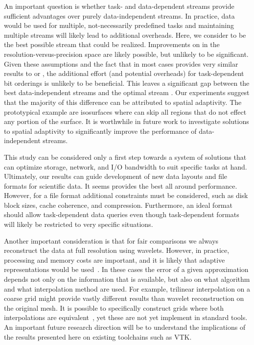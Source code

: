 {\color{red}An important question is whether task- and data-dependent streams provide sufficient
advantages over purely data-independent streams. In practice, data would be used for multiple,
not-necessarily predefined tasks and maintaining multiple streams will likely lead to additional
overheads. Here, we consider \ssig to be the best possible stream that could be realized.
Improvements on \ssig in the resolution-versus-precision space are likely possible, but unlikely to
be significant. Given these assumptions and the fact that \ssig in most cases provides very similar
results to \sbit or \swav, the additional effort (and potential overheads) for task-dependent bit
orderings is unlikely to be beneficial. This leaves a significant gap between the best
data-independent streams and the optimal stream \sopt. Our experiments suggest that the majority of
this difference can be attributed to spatial adaptivity. The prototypical example are isosurfaces
where \sopt can skip all regions that do not effect any portion of the surface. It is worthwhile in
future work to investigate solutions to spatial adaptivity to significantly improve the performance
of data-independent streams.}

This study can be considered only a first step towards a system of solutions that can optimize
storage, network, and I/O bandwidth to suit specific tasks at hand. Ultimately, our results can
guide development of new data layouts and file formats for scientific data. It seems \swav provides
the best all around performance. However, for a file format additional constraints must be
considered, such as disk block sizes, cache coherence, and compression. Furthermore, an ideal format
should allow task-dependent data queries even though task-dependent formats will likely be
restricted to very specific situations. 

Another important consideration is that for fair comparisons we always reconstruct the data at full
resolution using wavelets. However, in practice, processing and memory costs are important, and it
is likely that adaptive representations would be used~\cite{gigavoxels,Gobbetti2008,vdb2013}. In
these cases the error of a given approximation depends not only on the information that is
available, but also on what algorithm and what interpolation method are used. For example,
trilinear interpolation on a coarse grid might provide vastly different results than wavelet
reconstruction on the original mesh. It is possible to specifically construct grids where both
interpolations are equivalent~\cite{weiss}, yet these are not yet implement in standard tools. An
important future research direction will be to understand the implications of the results presented
here on existing toolchains such as VTK.

